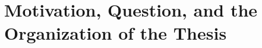 \section[Motivation, Question, and more]{Motivation, Question, and the Organization of the Thesis}
\label{intro:question}
